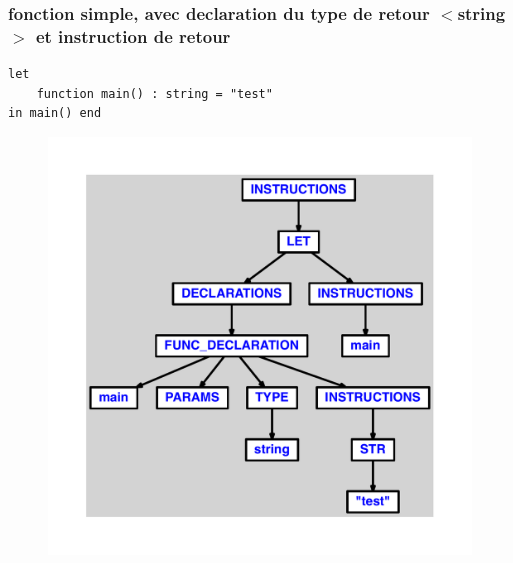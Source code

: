 \documentclass{article}
\begin{document}
\subsubsection{fonction simple, avec declaration du type de retour $ < $string$ > $ et instruction de retour}
\begin{lstlisting}
let
	function main() : string = "test"
in main() end
\end{lstlisting}
\newpage
\begin{figure}[H]
\centering
\includegraphics[max width=\textwidth]{ast/ast_238.pdf}
\end{figure}
\newpage
\end{document}
